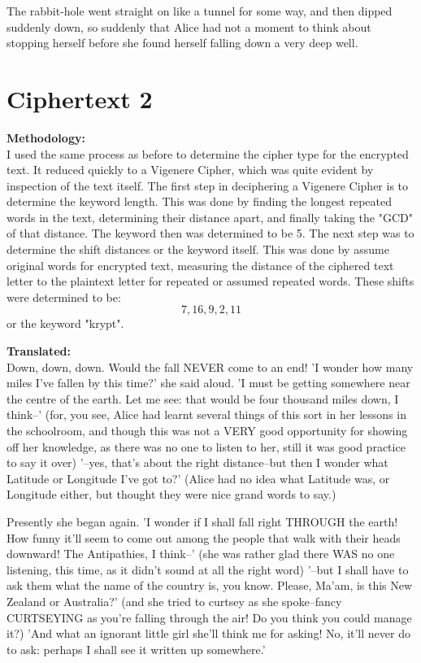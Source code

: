 \documentclass[12pt]{article}
\begin{document}
The rabbit-hole went straight on like a tunnel for some way, and then
dipped suddenly down, so suddenly that Alice had not a moment to think
about stopping herself before she found herself falling down a very deep
well.



\section{Ciphertext 2}
\textbf{Methodology:}\\
I used the same process as before to determine the cipher type for the encrypted text.  It reduced quickly to a Vigenere Cipher, which was quite evident by inspection of the text itself.  The first step in deciphering a Vigenere Cipher is to determine the keyword length.  This was done by finding the longest repeated words in the text, determining their distance apart, and finally taking the "GCD" of that distance.  The keyword then was determined to be 5.  The next step was to determine the shift distances or the keyword itself.  This was done by assume original words for encrypted text, measuring the distance of the ciphered text letter to the plaintext letter for repeated or assumed repeated words.  These shifts were determined to be: \[7,16,9,2,11\] or the keyword "krypt".

\hbox{}
\noindent
\textbf{Translated:}\\
Down, down, down. Would the fall NEVER come to an end! ’I wonder how
many miles I’ve fallen by this time?’ she said aloud. ’I must be getting
somewhere near the centre of the earth. Let me see: that would be four
thousand miles down, I think--’ (for, you see, Alice had learnt several
things of this sort in her lessons in the schoolroom, and though this
was not a VERY good opportunity for showing off her knowledge, as there
was no one to listen to her, still it was good practice to say it over)
’--yes, that’s about the right distance--but then I wonder what Latitude
or Longitude I’ve got to?’ (Alice had no idea what Latitude was, or
Longitude either, but thought they were nice grand words to say.)

Presently she began again. ’I wonder if I shall fall right THROUGH the
earth! How funny it’ll seem to come out among the people that walk with
their heads downward! The Antipathies, I think--’ (she was rather glad
there WAS no one listening, this time, as it didn’t sound at all the
right word) ’--but I shall have to ask them what the name of the country
is, you know. Please, Ma’am, is this New Zealand or Australia?’ (and
she tried to curtsey as she spoke--fancy CURTSEYING as you’re falling
through the air! Do you think you could manage it?) ’And what an
ignorant little girl she’ll think me for asking! No, it’ll never do to
ask: perhaps I shall see it written up somewhere.’
\end{document}
